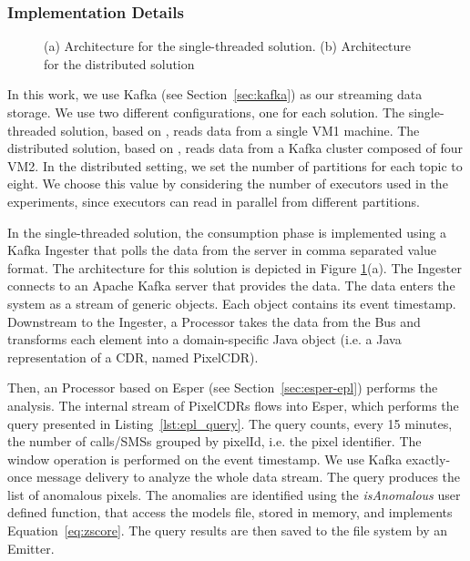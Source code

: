 {\subsubsection{Implementation Details}

\begin{figure}[ht]
\caption{(a) Architecture for the single-threaded solution. (b) Architecture for the distributed solution}
\label{fig:arch_impl}
\end{figure}

In this work, we use Kafka (see Section~\ref{sec:kafka}) as our streaming data storage. We use two different configurations, one for each solution. The single-threaded solution, based on \sti{}, reads data from a single VM1 machine. The distributed solution, based on \sparkdi{}, reads data from a Kafka cluster composed of four VM2. In the distributed setting, we set the number of partitions for each topic to eight. We choose this value by considering the number of executors used in the experiments, since executors can read in parallel from different partitions.

In the single-threaded solution, the consumption phase is implemented using a Kafka Ingester that polls the data from the server in comma separated value format. The architecture for this solution is depicted in Figure \ref{fig:arch_impl}(a). The Ingester connects to an Apache Kafka server that provides the data. The data enters the system as a stream of generic objects. Each object contains its event timestamp. Downstream to the Ingester, a Processor takes the data from the Bus and transforms each element into a domain-specific Java object (i.e. a Java representation of a CDR, named PixelCDR).

Then, an Processor based on Esper (see Section~\ref{sec:esper-epl}) performs the analysis. The internal stream of PixelCDRs flows into Esper, which performs the query presented in Listing~\ref{lst:epl_query}. The query counts, every 15 minutes, the number of calls/SMSs grouped by pixelId, i.e. the pixel identifier.
The window operation is performed on the event timestamp. We use Kafka exactly-once message delivery to analyze the whole data stream. The query produces the list of anomalous pixels.
The anomalies are identified using the \textit{isAnomalous} user defined function, that access the models file, stored in memory, and implements Equation~\eqref{eq:zscore}.
The query results are then saved to the file system by an Emitter.

}
